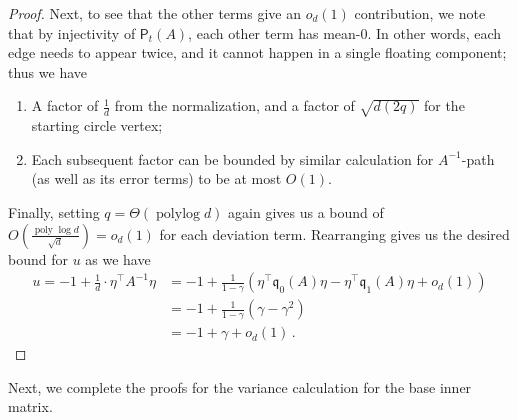 \documentclass[12pt]{article}
\newcommand{\poly}{\operatorname{poly}}
\newcommand{\polylog}{\operatorname{polylog}}
\newcommand{\gam}{\gamma}
\newcommand{\fp}{\mathsf{P}}
\newcommand{\q}{\mathfrak q}
\begin{document}
\begin{proof}
  	 Next, to see that the other terms give an $o_d(1)$ contribution, we note that by injectivity of $\fp_t(A)$, each other term has mean-$0$. In other words, each edge needs to appear twice, and it cannot happen in a single floating component; thus we have \begin{enumerate}
  	 	\item A factor of $\frac{1}{d}$ from the normalization, and a factor of $\sqrt{d (2q)}$ for the starting circle vertex;
  	 	\item Each subsequent factor can be bounded by similar calculation for $A^{-1}$-path (as well as its error terms) to be at most $O(1)$.
  	 \end{enumerate}
  	 Finally, setting $q=\Theta(\polylog d)$ again gives us a bound of $O(\frac{\poly\log d}{\sqrt{d}}) = o_d(1)$ for each deviation term.   	 Rearranging gives us the desired bound for $u$ as we have \begin{align*}
  	 	 u = -1 + \frac{1}{d}\cdot \eta^\top A^{-1}\eta  &= -1+ \frac{1}{1-\gamma} (\eta^\top \q_0(A) \eta - \eta^\top \q_1(A) \eta  +o_d(1) ) \\&= -1 +\frac{1}{1-\gam }(\gam -\gam^2)\\&=-1+\gam +o_d(1)\,.  	    	 \end{align*}
	\end{proof}
	
	
Next, we complete the proofs for the variance calculation for the base inner matrix.
\EtaAInvEtaConcentration*
\WoodburyCorrectionConcentration*
\end{document}
